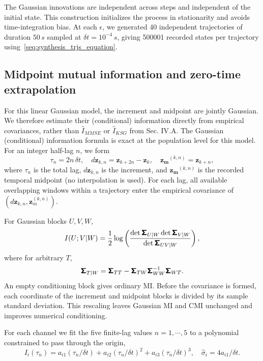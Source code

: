 The Gaussian innovations are independent across steps and independent of the initial state. This construction initializes the process in stationarity and avoids time-integration bias. At each $\epsilon$, we generated 40 independent trajectories of duration $50\,s$ sampled at $\delta t=10^{-4} \,s$, giving 500001 recorded states per trajectory using~\eqref{seq:synthesis_trjs_equation}.

\subsection{Midpoint mutual information and zero-time extrapolation}
\vspace*{-0.6\baselineskip}

For this linear Gaussian model, the increment and midpoint are jointly Gaussian. We therefore estimate their (conditional) information directly from empirical covariances, rather than $\hat I_{MMSE}$ or $\hat I_{KSG}$ from Sec. IV.A. The Gaussian (conditional) information formula is exact at the population level for this model. For an integer half-lag $n$, we form
\[
    \tau_n=2n\,\delta t,
    \quad
    d\bm z_{k,n}=\bm z_{k+2n}-\bm z_k,
    \quad
    \bm {z_m}^{(k,n)}=\bm z_{k+n},
\]
where $\tau_n$ is the total lag, $d\bm z_{k,n}$ is the increment, and $\bm {z_m}^{(k,n)}$ is the recorded temporal midpoint (no interpolation is used). For each lag, all available overlapping windows within a trajectory enter the empirical covariance of $\left(d\bm z_{k,n},\bm z_m^{(k,n)}\right)$.

For Gaussian blocks $U,V,W$,
\begin{equation*}
    I(U;V|W)=\frac{1}{2}\log\left(\frac{\det\boldsymbol{\mathsf{\Sigma}}_{U|W}\det\boldsymbol{\mathsf{\Sigma}}_{V|W}}{\det\boldsymbol{\mathsf{\Sigma}}_{UV|W}}\right),
\end{equation*}
where for arbitrary $T$,
\begin{equation*}
    \boldsymbol{\mathsf{\Sigma}}_{T|W}=\boldsymbol{\mathsf{\Sigma}}_{TT}-\boldsymbol{\mathsf{\Sigma}}_{TW}\boldsymbol{\mathsf{\Sigma}}_{WW}^{-1}\boldsymbol{\mathsf{\Sigma}}_{WT}.
\end{equation*}
An empty conditioning block gives ordinary MI. Before the covariance is formed, each coordinate of the increment and midpoint blocks is divided by its sample standard deviation. This rescaling leaves Gaussian MI and CMI unchanged and improves numerical conditioning. 

For each channel we fit the five finite-lag values $n=1,\cdots,5$ to a polynomial constrained to pass through the origin,
\begin{equation}
    I_i(\tau_n)=a_{i1}(\tau_n/\delta t)+a_{i2}(\tau_n/\delta t)^2+a_{i3}(\tau_n/\delta t)^3,
    \quad
    \hat\sigma_i=4 a_{i1}/\delta t.
    \label{seq:W5-cubic}
\end{equation}

